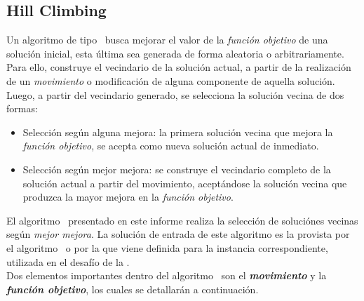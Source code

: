 \documentclass[../informe2.tex]{subfiles}
\begin{document}
\subsection{Hill Climbing}
Un algoritmo de tipo \hillc\ busca mejorar el valor de la \textit{función objetivo} de una solución inicial, esta última sea generada de forma aleatoria o arbitrariamente. Para ello, construye el vecindario de la solución actual, a partir de la realización de un \textit{movimiento} o modificación de alguna componente de aquella solución. Luego, a partir del vecindario generado, se selecciona la solución vecina de dos formas:
\begin{itemize}
	\item Selección según alguna mejora: la primera solución vecina que mejora la \textit{función objetivo}, se acepta como nueva solución actual de inmediato.
	\item Selección según mejor mejora: se construye el vecindario completo de la solución actual a partir del movimiento,  aceptándose la solución vecina que produzca la mayor mejora en la \textit{función objetivo}.
\end{itemize}
El algoritmo \hillc\ presentado en este informe realiza la selección de soluciónes vecinas según \textit{mejor mejora}. La solución de entrada de este algoritmo es la provista por el algoritmo \greedy\ o por la que viene definida para la instancia correspondiente, utilizada en el desafío de la \roadef.\\
Dos elementos importantes dentro del algoritmo \hillc\ son el \textbf{\textit{movimiento}} y la \textbf{\textit{función objetivo}}, los cuales se detallarán a continuación.
\end{document}
